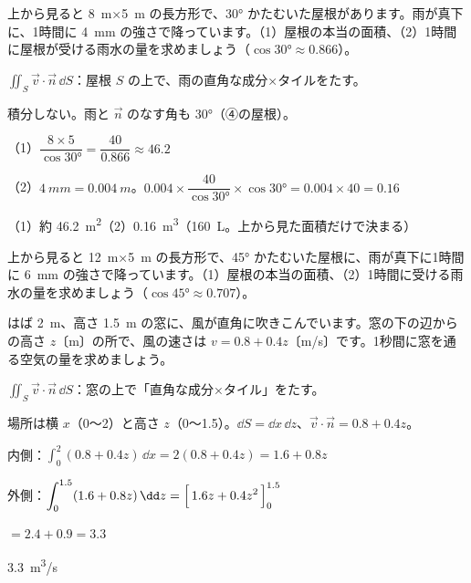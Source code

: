 \begin{reidai}[屋根に降る雨]
上から見ると \qty{8}{m}×\qty{5}{m} の長方形で、\ang{30} かたむいた屋根があります。雨が真下に、1時間に \qty{4}{mm} の強さで降っています。（1）屋根の本当の面積、（2）1時間に屋根が受ける雨水の量を求めましょう（$\cos\ang{30}\approx0.866$）。\par
\kangaekata {}\par
{}\enspace $\displaystyle\iint_S\vec v\cdot\vec n\,\dd S$：屋根 $S$ の上で、雨の直角な成分×タイルをたす。\par
{}\enspace 積分しない。雨と $\vec n$ のなす角も \ang{30}（④の屋根）。\par
\shiki\kviiiis{}\zw{} （1）$\dfrac{8\times5}{\cos\ang{30}}=\dfrac{40}{0.866}\approx46.2$\par
\kviiiia （2）$\qty{4}{mm}=\qty{0.004}{m}$。$0.004\times\dfrac{40}{\cos\ang{30}}\times\cos\ang{30}=0.004\times40=0.16$\par
\kotae\kviiiis{}\zw{} （1）約 \qty{46.2}{m^2}\quad （2）\qty{0.16}{m^3}（\qty{160}{L}。上から見た面積だけで決まる）
\end{reidai}

\begin{jibun}
上から見ると \qty{12}{m}×\qty{5}{m} の長方形で、\ang{45} かたむいた屋根に、雨が真下に1時間に \qty{6}{mm} の強さで降っています。（1）屋根の本当の面積、（2）1時間に受ける雨水の量を求めましょう（$\cos\ang{45}\approx0.707$）。
\end{jibun}

\begin{reidai}
はば \qty{2}{m}、高さ \qty{1.5}{m} の窓に、風が直角に吹きこんでいます。窓の下の辺からの高さ $z$〔m〕の所で、風の速さは $v=0.8+0.4z$〔m/s〕です。1秒間に窓を通る空気の量を求めましょう。\par
\kangaekata {}\par
{}\enspace $\displaystyle\iint_S\vec v\cdot\vec n\,\dd S$：窓の上で「直角な成分×タイル」をたす。\par
{}\enspace 場所は横 $x$（0〜2）と高さ $z$（0〜1.5）。$\dd S=\dd x\,\dd z$、$\vec v\cdot\vec n=0.8+0.4z$。\par
\shiki\kviiiis{}\zw{} 内側：$\displaystyle\int_0^2(0.8+0.4z)\,\dd x=2(0.8+0.4z)=1.6+0.8z$\par
\kviiiia 外側：$\displaystyle\int_0^{1.5}(1.6+0.8z)\,\dd z=\Bigl[\,1.6z+0.4z^2\,\Bigr]_0^{1.5}$\par
\kviiiib $=2.4+0.9=3.3$\par
\kotae\kviiiis{}\zw{} \qty{3.3}{m^3/s}
\end{reidai}

